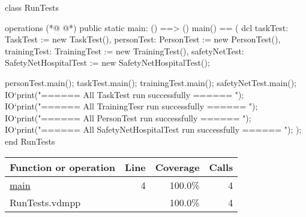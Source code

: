 \begin{vdmpp}[breaklines=true]
class RunTests

operations
(*@
\label{main:4}
@*)
 public static main: () ==> ()
   main() == (
    dcl taskTest: TaskTest := new TaskTest(), personTest: PersonTest := new PersonTest(), 
     trainingTest: TrainingTest := new TrainingTest(), safetyNetTest: SafetyNetHospitalTest := new SafetyNetHospitalTest();
    
    personTest.main();
    taskTest.main(); 
    trainingTest.main();
    safetyNetTest.main();
    IO`print("\n\n ====== All TaskTest run successfully ====== \n\n");
    IO`print("\n\n ====== All TrainingTesr run successfully ====== \n\n");
    IO`print("\n\n ====== All PersonTest run successfully ====== \n\n");
   IO`print("\n\n ====== All SafetyNetHospitalTest run successfully ====== \n\n");
   );
end RunTests
\end{vdmpp}
\bigskip
\begin{longtable}{|l|r|r|r|}
\hline
Function or operation & Line & Coverage & Calls \\
\hline
\hline
\hyperref[main:4]{main} & 4&100.0\% & 4 \\
\hline
\hline
RunTests.vdmpp & & 100.0\% & 4 \\
\hline
\end{longtable}

